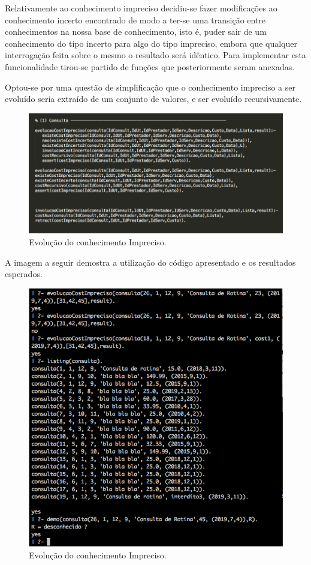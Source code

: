 \documentclass[25pt]{article}
\begin{document}
Relativamente ao conhecimento impreciso decidiu-se fazer modificações ao conhecimento incerto encontrado de modo a ter-se uma transição entre conhecimentos na nossa base de conhecimento, isto é, puder sair de um conhecimento do tipo incerto para algo do tipo impreciso, embora que qualquer interrogação feita sobre o mesmo o resultado será idêntico.
Para implementar esta funcionalidade tirou-se partido de funções que posteriormente seram anexadas.

Optou-se por uma questão de simplificação que o conhecimento impreciso a ser evoluído seria extraído de um conjunto de valores, e ser evoluído recursivamente.

\begin{figure}[H]
\centering\includegraphics[scale=0.55]{evolucaoConsulta}
\caption{\label{fig:controller} Evolução do conhecimento Impreciso.}
\end{figure}

A imagem a seguir demostra a utilização do código apresentado e os resultados esperados.

\begin{figure}[H]
\centering\includegraphics[scale=0.55]{imprecisooo}
\caption{\label{fig:controller} Evolução do conhecimento Impreciso.}
\end{figure}
\end{document}
